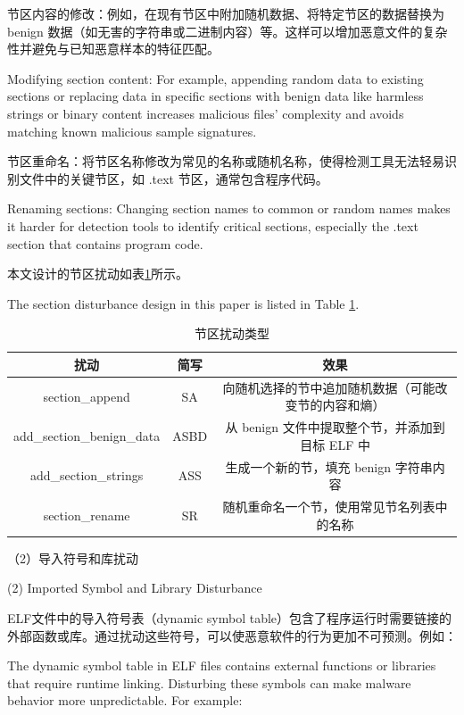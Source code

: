 节区内容的修改：例如，在现有节区中附加随机数据、将特定节区的数据替换为 benign 数据（如无害的字符串或二进制内容）等。这样可以增加恶意文件的复杂性并避免与已知恶意样本的特征匹配。

Modifying section content: For example, appending random data to existing sections or replacing data in specific sections with benign data like harmless strings or binary content increases malicious files’ complexity and avoids matching known malicious sample signatures.

节区重命名：将节区名称修改为常见的名称或随机名称，使得检测工具无法轻易识别文件中的关键节区，如 .text 节区，通常包含程序代码。

Renaming sections: Changing section names to common or random names makes it harder for detection tools to identify critical sections, especially the .text section that contains program code.

本文设计的节区扰动如表\ref{tab:4.1}所示。

The section disturbance design in this paper is listed in Table \ref{tab:4.1}.

\begin{table}[htbp]
	\centering
	\caption{节区扰动类型}\label{tab:4.1}
	\begin{tabular*}{\textwidth}{@{\extracolsep{\fill}}ccc}
		\toprule
		扰动 & 简写 & 效果 \\
		\midrule
		section\_append & SA & 向随机选择的节中追加随机数据（可能改变节的内容和熵） \\
		add\_section\_benign\_data & ASBD & 从 benign 文件中提取整个节，并添加到目标 ELF 中 \\
		add\_section\_strings & ASS & 生成一个新的节，填充 benign 字符串内容 \\
		section\_rename & SR & 随机重命名一个节，使用常见节名列表中的名称 \\
		\bottomrule
	\end{tabular*}
\end{table}

（2）导入符号和库扰动

(2) Imported Symbol and Library Disturbance

ELF文件中的导入符号表（dynamic symbol table）包含了程序运行时需要链接的外部函数或库。通过扰动这些符号，可以使恶意软件的行为更加不可预测。例如：

The dynamic symbol table in ELF files contains external functions or libraries that require runtime linking. Disturbing these symbols can make malware behavior more unpredictable. For example:

